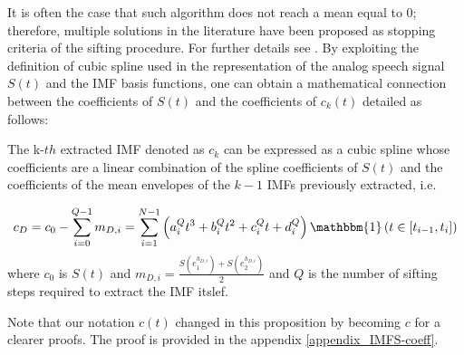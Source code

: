 It is often the case that such algorithm does not reach a mean equal to 0; therefore, multiple solutions in the literature have been proposed as stopping criteria of the sifting procedure. For further details see \cite{Machine}. By exploiting the definition of cubic spline used in the representation of the analog speech signal $S(t)$ and the IMF basis functions, one can obtain a mathematical connection between the coefficients of $S(t)$ and the coefficients of $c_k(t)$ detailed as follows: 

\begin{Proposition}
\label{prop_cs}
The k-$th$ extracted IMF denoted as $c_k$ can be expressed as a cubic spline whose coefficients are a linear combination of the spline coefficients of $S(t)$ and the coefficients of the mean envelopes of the $k-1$ IMFs previously extracted, i.e.

\begin{equation}
c_D = c_0 - \sum_{i=0}^{Q-1} m_{D,i} = \sum_{i=1}^{N-1} \left( a_i^Q t^3 + b_i^Q t^2 + c_i^Q t + d_i^Q \right) \mathbbm{1} \left( t \in \left[ t_{i-1}, t_i \right] \right)
\end{equation}
where $c_0$ is $S(t)$ and $m_{D,i} = \frac{S(e_1^{h_{D,i}})+S(e_2^{h_{D,i}})}{2}$ and $Q$ is the number of sifting steps required to extract the IMF itslef.
\end{Proposition}

Note that our notation $c(t)$ changed in this proposition by becoming $c$ for a clearer proofs. The proof is provided in the appendix \ref{appendix_IMFS-coeff}.
